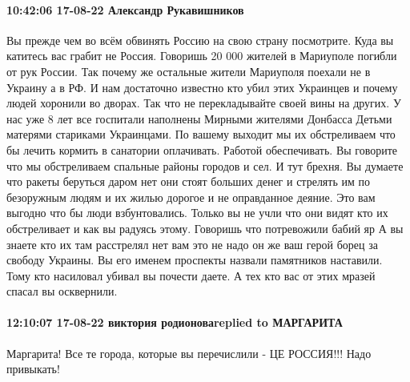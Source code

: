 \paragraph{10:42:06 17-08-22 Александр Рукавишников}

Вы прежде чем во всём обвинять Россию на свою страну посмотрите. Куда вы
катитесь вас грабит не Россия. Говоришь 20 000 жителей в Мариуполе погибли от
рук России. Так почему же остальные жители Мариуполя поехали не в Украину а в
РФ. И нам достаточно известно кто убил этих Украинцев и почему людей хоронили
во дворах. Так что не перекладывайте своей вины на других. У нас уже 8 лет все
госпитали наполнены Мирными жителями Донбасса Детьми матерями стариками
Украинцами. По вашему выходит мы их обстреливаем что бы лечить кормить в
санатории оплачивать. Работой обеспечивать. Вы говорите что мы обстреливаем
спальные районы городов и сел. И тут брехня. Вы думаете что ракеты беруться
даром нет они стоят больших денег и стрелять им по безоружным людям и их жилью
дорогое и не оправданное деяние. Это вам выгодно что бы люди взбунтовались.
Только вы не учли что они видят кто их обстреливает и как вы радуясь этому.
Говоришь что потревожили бабий яр А вы знаете кто их там расстрелял нет вам это
не надо он же ваш герой борец за свободу Украины. Вы его именем проспекты
назвали памятников наставили. Тому кто насиловал убивал вы почести даете. А тех
кто вас от этих мразей спасал вы осквернили.

\paragraph{12:10:07 17-08-22 виктория родионоваreplied to МАРГАРИТА}

Маргарита! Все те города, которые вы перечислили - ЦЕ РОССИЯ!!! Надо привыкать!
